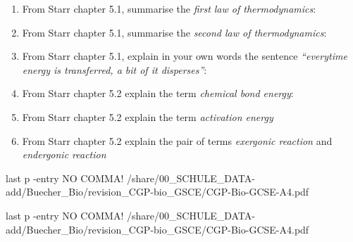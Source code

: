 \begin{enumerate}[itemsep=1.2em, leftmargin=*]
	\item  From  Starr chapter 5.1, summarise the \emph{first law of thermodynamics}: \\
		
	\item  From  Starr chapter 5.1, summarise the \emph{second law of thermodynamics}:\\
	
	\item  From  Starr chapter 5.1, explain in your own words the sentence \textit{``everytime energy is transferred, a bit of it disperses''}:\\
		
	\item From  Starr chapter 5.2 explain the term \emph{chemical bond energy}:\\
		
	\item From  Starr chapter 5.2 explain the term \emph{activation energy}\\
	
	\item From  Starr chapter 5.2 explain the pair of terms \emph{exergonic reaction} and \emph{endergonic reaction} \\
\end{enumerate}


 last p -entry NO COMMA!
     {/share/00_SCHULE_DATA-add/Buecher_Bio/revision_CGP-bio_GSCE/CGP-Bio-GCSE-A4.pdf}

 last p -entry NO COMMA!
     {/share/00_SCHULE_DATA-add/Buecher_Bio/revision_CGP-bio_GSCE/CGP-Bio-GCSE-A4.pdf}


